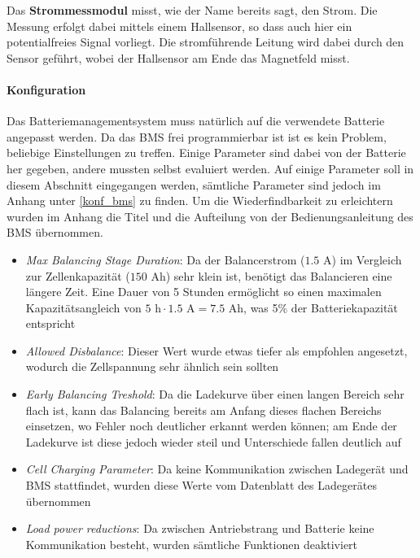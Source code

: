 Das \textbf{Strommessmodul} misst, wie der Name bereits sagt, den Strom. Die Messung erfolgt dabei mittels einem Hallsensor, so dass auch hier ein potentialfreies Signal vorliegt. Die stromführende Leitung wird dabei durch den Sensor geführt, wobei der Hallsensor am Ende das Magnetfeld misst.

\paragraph{Konfiguration}
Das Batteriemanagementsystem muss natürlich auf die verwendete Batterie angepasst werden. Da das BMS frei programmierbar ist ist es kein Problem, beliebige Einstellungen zu treffen. Einige Parameter sind dabei von der Batterie her gegeben, andere mussten selbst evaluiert werden. Auf einige Parameter soll in diesem Abschnitt eingegangen werden, sämtliche Parameter sind jedoch im Anhang unter \ref{konf_bms} zu finden. Um die Wiederfindbarkeit zu erleichtern wurden im Anhang die Titel und die Aufteilung von der Bedienungsanleitung des BMS \cite{bms} übernommen. \begin{itemize}
	\item \textit{Max Balancing Stage Duration}: Da der Balancerstrom ($1.5$ A) im Vergleich zur Zellenkapazität ($150$ Ah) sehr klein ist, benötigt das Balancieren eine längere Zeit. Eine Dauer von 5 Stunden ermöglicht so einen maximalen Kapazitätsangleich von $5\text{ h}\cdot 1.5\text{ A}=7.5$ Ah, was 5\% der Batteriekapazität entspricht
	\item \textit{Allowed Disbalance}: Dieser Wert wurde etwas tiefer als empfohlen angesetzt, wodurch die Zellspannung sehr ähnlich sein sollten
	\item \textit{Early Balancing Treshold}: Da die Ladekurve über einen langen Bereich sehr flach ist, kann das Balancing bereits am Anfang dieses flachen Bereichs einsetzen, wo Fehler noch deutlicher erkannt werden können; am Ende der Ladekurve ist diese jedoch wieder steil und Unterschiede fallen deutlich auf
	\item \textit{Cell Charging Parameter}: Da keine Kommunikation zwischen Ladegerät und BMS stattfindet, wurden diese Werte vom Datenblatt des Ladegerätes übernommen \cite{ladegeraet}
	\item \textit{Load power reductions}: Da zwischen Antriebstrang und Batterie keine Kommunikation besteht, wurden sämtliche Funktionen deaktiviert
\end{itemize}